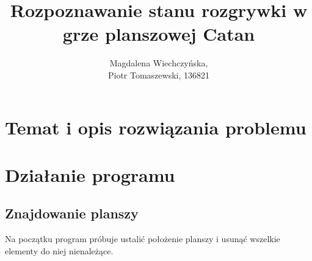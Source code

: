 \documentclass[a4paper]{article}
\title{Rozpoznawanie stanu rozgrywki w grze planszowej Catan}
\author{Magdalena Wiechczyńska, \\
Piotr Tomaszewski, 136821}
\date{} %
\begin{document}
\maketitle

\section{Temat i opis rozwiązania problemu}

\section{Działanie programu}
    \subsection{Znajdowanie planszy}
    Na początku program próbuje ustalić położenie planszy i usunąć wszelkie elementy do niej nienależące.
\end{document}
